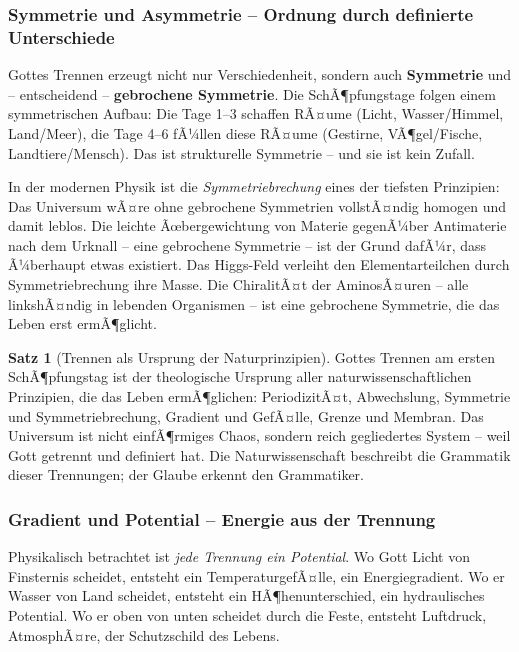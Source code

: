 ﻿\documentclass[a4paper,12pt]{article}
\theoremstyle{definition}
\newtheorem{theorem}{Satz}[section]
\begin{document}
\subsubsection{Symmetrie und Asymmetrie -- Ordnung durch definierte Unterschiede}

Gottes Trennen erzeugt nicht nur Verschiedenheit, sondern auch \textbf{Symmetrie}
und -- entscheidend -- \textbf{gebrochene Symmetrie}. Die SchÃ¶pfungstage folgen
einem symmetrischen Aufbau: Die Tage 1--3 schaffen RÃ¤ume (Licht, Wasser/Himmel,
Land/Meer), die Tage 4--6 fÃ¼llen diese RÃ¤ume (Gestirne, VÃ¶gel/Fische,
Landtiere/Mensch). Das ist strukturelle Symmetrie -- und sie ist kein Zufall.

In der modernen Physik ist die \textit{Symmetriebrechung} eines der tiefsten
Prinzipien: Das Universum wÃ¤re ohne gebrochene Symmetrien vollstÃ¤ndig homogen
und damit leblos. Die leichte Ãœbergewichtung von Materie gegenÃ¼ber Antimaterie
nach dem Urknall -- eine gebrochene Symmetrie -- ist der Grund dafÃ¼r, dass
Ã¼berhaupt etwas existiert. Das Higgs-Feld verleiht den Elementarteilchen durch
Symmetriebrechung ihre Masse. Die ChiralitÃ¤t der AminosÃ¤uren -- alle linkshÃ¤ndig
in lebenden Organismen -- ist eine gebrochene Symmetrie, die das Leben erst
ermÃ¶glicht.

\begin{theorem}[Trennen als Ursprung der Naturprinzipien]
	Gottes Trennen am ersten SchÃ¶pfungstag ist der theologische Ursprung aller
	naturwissenschaftlichen Prinzipien, die das Leben ermÃ¶glichen: PeriodizitÃ¤t,
	Abwechslung, Symmetrie und Symmetriebrechung, Gradient und GefÃ¤lle, Grenze
	und Membran. Das Universum ist nicht einfÃ¶rmiges Chaos, sondern reich gegliedertes
	System -- weil Gott getrennt und definiert hat. Die Naturwissenschaft beschreibt
	die Grammatik dieser Trennungen; der Glaube erkennt den Grammatiker.
\end{theorem}

\subsubsection{Gradient und Potential -- Energie aus der Trennung}

Physikalisch betrachtet ist \textit{jede Trennung ein Potential}. Wo Gott Licht
von Finsternis scheidet, entsteht ein TemperaturgefÃ¤lle, ein Energiegradient.
Wo er Wasser von Land scheidet, entsteht ein HÃ¶henunterschied, ein hydraulisches
Potential. Wo er oben von unten scheidet durch die Feste, entsteht Luftdruck,
AtmosphÃ¤re, der Schutzschild des Lebens.
\end{document}
